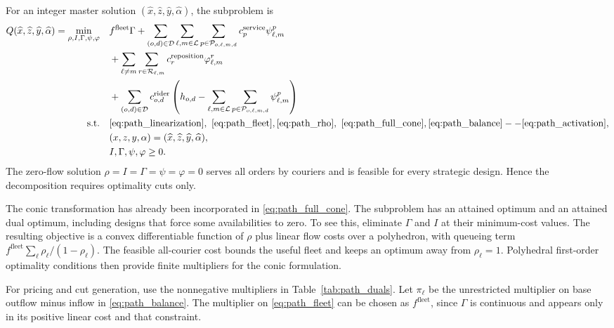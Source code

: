 \documentclass[final,3p,authoryear]{elsarticle}
\begin{document}
For an integer master solution $(\widehat x,\widehat z,\widehat y,\widehat\alpha)$, the subproblem is
\begin{equation}
\begin{aligned}
 Q(\widehat x,\widehat z,\widehat y,\widehat\alpha)
 =\min_{\rho,I,\Gamma,\psi,\varphi}\quad
 &f^{\mathrm{fleet}}\Gamma
 +\sum_{(o,d)\in\mathcal D}\sum_{\ell,m\in\mathcal L}
  \sum_{p\in\mathcal P_{o,\ell,m,d}}c_p^{\mathrm{service}}\psi_{\ell,m}^{p}\\
 &+\sum_{\ell\ne m}\sum_{r\in\mathcal R_{\ell,m}}
  c_r^{\mathrm{reposition}}\varphi_{\ell,m}^{r}\\
 &+\sum_{(o,d)\in\mathcal D}c_{o,d}^{\mathrm{rider}}
  \left(h_{o,d}-\sum_{\ell,m\in\mathcal L}
  \sum_{p\in\mathcal P_{o,\ell,m,d}}\psi_{\ell,m}^{p}\right)\\
 \text{s.t.}\quad
 &\eqref{eq:path_linearization},\ \eqref{eq:path_fleet},
  \eqref{eq:path_rho},\ \eqref{eq:path_full_cone},
  \eqref{eq:path_balance}--\eqref{eq:path_activation},\\
 &(x,z,y,\alpha)=(\widehat x,\widehat z,\widehat y,\widehat\alpha),\\
 &I,\Gamma,\psi,\varphi\ge0.
\end{aligned}
\label{eq:path_subproblem}
\end{equation}
The zero-flow solution $\rho=I=\Gamma=\psi=\varphi=0$ serves all orders by couriers and is feasible for every strategic design.
Hence the decomposition requires optimality cuts only.

The conic transformation has already been incorporated in \eqref{eq:path_full_cone}.
The subproblem has an attained optimum and an attained dual optimum, including designs that force some availabilities to zero.
To see this, eliminate $\Gamma$ and $I$ at their minimum-cost values.
The resulting objective is a convex differentiable function of $\rho$ plus linear flow costs over a polyhedron, with queueing term $f^{\mathrm{fleet}}\sum_\ell\rho_\ell/(1-\rho_\ell)$.
The feasible all-courier cost bounds the useful fleet and keeps an optimum away from $\rho_\ell=1$.
Polyhedral first-order optimality conditions then provide finite multipliers for the conic formulation.

For pricing and cut generation, use the nonnegative multipliers in Table~\ref{tab:path_duals}.
Let $\pi_\ell$ be the unrestricted multiplier on base outflow minus inflow in \eqref{eq:path_balance}.
The multiplier on \eqref{eq:path_fleet} can be chosen as $f^{\mathrm{fleet}}$, since $\Gamma$ is continuous and appears only in its positive linear cost and that constraint.
\end{document}
